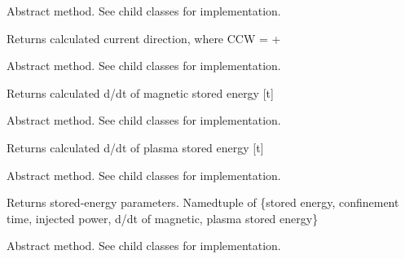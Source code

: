 \documentclass[letterpaper,10pt,english]{sphinxmanual}
\begin{document}
\begin{fulllineitems}
\begin{fulllineitems}
\label{eqtools:eqtools.core.Equilibrium.getCurrentSign}
Abstract method.  See child classes for implementation.

Returns calculated current direction, where CCW = +

\end{fulllineitems}


\begin{fulllineitems}
\label{eqtools:eqtools.core.Equilibrium.getWbdot}
Abstract method.  See child classes for implementation.

Returns calculated d/dt of magnetic stored energy {[}t{]}

\end{fulllineitems}


\begin{fulllineitems}
\label{eqtools:eqtools.core.Equilibrium.getWpdot}
Abstract method.  See child classes for implementation.

Returns calculated d/dt of plasma stored energy {[}t{]}

\end{fulllineitems}


\begin{fulllineitems}
\label{eqtools:eqtools.core.Equilibrium.getEnergy}
Abstract method.  See child classes for implementation.

Returns stored-energy parameters.
Namedtuple of \{stored energy, confinement time, injected power, d/dt of magnetic, plasma stored energy\}

\end{fulllineitems}


\begin{fulllineitems}
\label{eqtools:eqtools.core.Equilibrium.getParam}
Abstract method.  See child classes for implementation.


\end{fulllineitems}
\end{fulllineitems}
\end{document}
